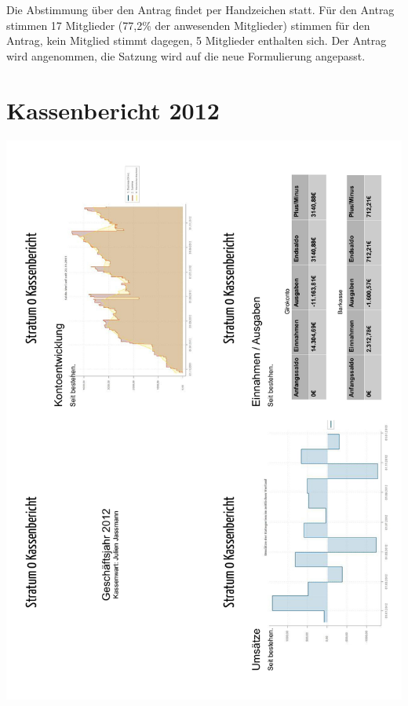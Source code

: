 \documentclass[a4paper,12pt]{scrartcl}
\begin{document}
Die Abstimmung über den Antrag findet per Handzeichen statt. Für den Antrag
stimmen 17 Mitglieder (77{,}2\% der anwesenden Mitglieder) stimmen für den
Antrag, kein Mitglied stimmt dagegen, 5 Mitglieder enthalten sich. Der
Antrag wird angenommen, die Satzung wird auf die neue Formulierung angepasst.

\appendix
\section{Kassenbericht 2012}
\includegraphics[width=\textwidth]{images/Kassenbericht_2012_1.pdf}
\newpage
\end{document}
